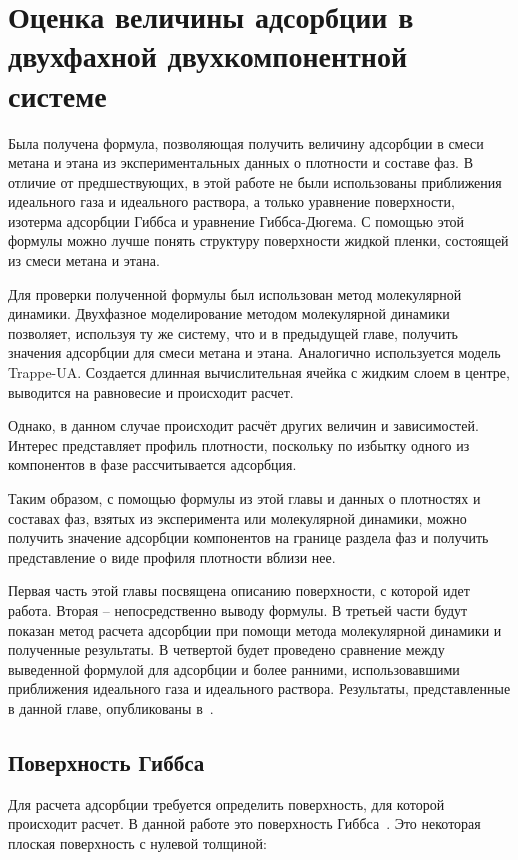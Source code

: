\chapter{Оценка величины адсорбции в двухфахной двухкомпонентной системе}

Была получена формула, позволяющая получить величину адсорбции в смеси метана и этана из экспериментальных данных о плотности и составе фаз. В отличие от предшествующих, в этой работе не были использованы приближения идеального газа и идеального раствора, а только уравнение поверхности, изотерма адсорбции Гиббса и уравнение Гиббса-Дюгема. С помощью этой формулы можно лучше понять структуру поверхности жидкой пленки, состоящей из смеси метана и этана.

Для проверки полученной формулы был использован метод молекулярной динамики. Двухфазное моделирование методом молекулярной динамики позволяет, используя ту же систему, что и в предыдущей главе, получить значения адсорбции для смеси метана и этана. Аналогично используется модель Trappe-UA. Создается длинная вычислительная ячейка с жидким слоем в центре, выводится на равновесие и происходит расчет.

Однако, в данном случае происходит расчёт других величин и зависимостей. Интерес представляет профиль плотности, поскольку по избытку одного из компонентов в фазе рассчитывается адсорбция.

Таким образом, с помощью формулы из этой главы и данных о плотностях и составах фаз, взятых из эксперимента или молекулярной динамики, можно получить значение адсорбции компонентов на границе раздела фаз и получить представление о виде профиля плотности вблизи нее.

Первая часть этой главы посвящена описанию поверхности, с которой идет работа. Вторая \--- непосредственно выводу формулы. В третьей части будут показан метод расчета адсорбции при помощи метода молекулярной динамики и полученные результаты. В четвертой будет проведено сравнение между выведенной формулой для адсорбции и более ранними, использовавшими приближения идеального газа и идеального раствора. Результаты, представленные в данной главе, опубликованы в~\cite{RJOPC285654}.

\section{Поверхность Гиббса}

Для расчета адсорбции требуется определить поверхность, для которой происходит расчет. В данной работе это поверхность Гиббса~\cite{kalikmanov_nucleation_2013}. Это некоторая плоская поверхность с нулевой толщиной:

